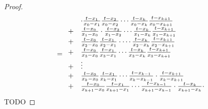 \documentclass[tmi_notities.tex]{subfiles}
\begin{document}
\begin{enumerate}
\begin{proof}
\[\]
\[
=
\begin{array}{l l}
& \cdot \frac{t-x_{1}}{x_{0}-x_{1}} \frac{t-x_{2}}{x_{0}-x_{2}}\cdots \frac{t-x_{k}}{x_{0}-x_{k}} \frac{t-x_{k+1}}{x_{0}-x_{k+1}}\\
+ &  \frac{t-x_{0}}{x_{1}-x_{0}} \cdot\frac{t-x_{2}}{x_{1}-x_{2}}\cdots \frac{t-x_{k}}{x_{1}-x_{k}} \frac{t-x_{k+1}}{x_{1}-x_{k+1}}\\
+ &  \frac{t-x_{0}}{x_{2}-x_{0}} \frac{t-x_{1}}{x_{2}-x_{1}}\cdot \cdots \frac{t-x_{k}}{x_{2}-x_{k}} \frac{t-x_{k+1}}{x_{2}-x_{k+1}}\\
+ &  \frac{t-x_{0}}{x_{3}-x_{0}} \frac{t-x_{1}}{x_{3}-x_{1}} \cdots \frac{t-x_{k}}{x_{3}-x_{k}} \frac{t-x_{k+1}}{x_{3}-x_{k+1}}\\
+ & \vdots\\
+ & \frac{t-x_{0}}{x_{k}-x_{0}} \frac{t-x_{1}}{x_{k}-x_{1}}\cdots \frac{t-x_{k-1}}{x_{k}-x_{k-1}} \cdot \frac{t-x_{k+1}}{x_{k}-x_{k+1}}\\
+ & \frac{t-x_{0}}{x_{k+1}-x_{0}} \frac{t-x_{1}}{x_{k+1}-x_{1}}\cdots \frac{t-x_{k-1}}{x_{k+1}-x_{k-1}} \cdot \frac{t-x_{k}}{x_{k+1}-x_{k}}\cdot
\end{array}
\]
TODO

\end{proof}
\end{enumerate}

\end{document}
